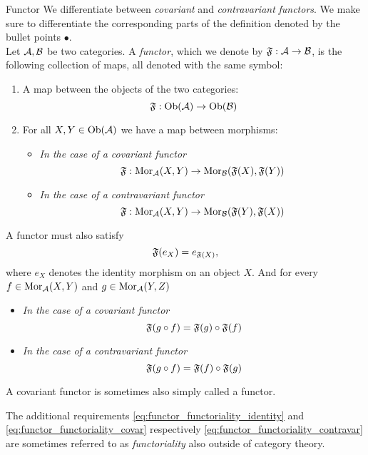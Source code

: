 \begin{definition}{Functor \cite[Sec.~1.3]{Roman2017}}{}
We differentiate between \emph{covariant} and \emph{contravariant} \emph{functors}.
We make sure to differentiate the corresponding parts of the definition denoted by the bullet points $\bullet$.\\

Let $\mathcal{A}, \mathcal{B}$ be two categories. A \emph{functor}, which we denote by $\mathfrak{F}: \mathcal{A} \to \mathcal{B}$, is the following collection of maps, all denoted with the same symbol:
\begin{enumerate}
    \item A map between the objects of the two categories:
    $$
    \mathfrak{F}: \mathrm {Ob}(\mathcal{A}) \to \mathrm {Ob}(\mathcal{B})
    $$
    \item For all $X,Y \in \mathrm {Ob}(\mathcal{A})$ we have a map between morphisms: 
    \begin{itemize}
        \item \emph{In the case of a covariant functor} $$\mathfrak{F}: \mathrm {Mor}_{\mathcal{A}}(X,Y) \to \mathrm {Mor}_{\mathcal{B}}(\mathfrak{F}(X), \mathfrak{F}(Y))$$
        \item \emph{In the case of a contravariant functor} $$\mathfrak{F}: \mathrm {Mor}_{\mathcal{A}}(X,Y) \to \mathrm {Mor}_{\mathcal{B}}(\mathfrak{F}(Y), \mathfrak{F}(X))$$
    \end{itemize}
\end{enumerate}
A functor must also satisfy
\begin{equation}
\label{eq:functor_functoriality_identity}
\mathfrak{F}(e_X) = e_{\mathfrak{F}(X)},
\end{equation}
where $e_X$ denotes the identity morphism on an object $X$. And for every ${f \in \mathrm {Mor}_{\mathcal{A}}(X,Y)}$ and $g \in \mathrm {Mor}_{\mathcal{A}}(Y,Z)$
\begin{itemize}
    \item \emph{In the case of a covariant functor}
    \begin{equation}
    \label{eq:functor_functoriality_covar}
    \mathfrak{F}(g \circ f) = \mathfrak{F}(g) \circ \mathfrak{F}(f)
    \end{equation}
    
    \item \emph{In the case of a contravariant functor}
    \begin{equation}
    \label{eq:functor_functoriality_contravar}
    \mathfrak{F}(g \circ f) = \mathfrak{F}(f) \circ \mathfrak{F}(g)
    \end{equation}
\end{itemize}
A covariant functor is sometimes also simply called a functor.
\end{definition}

The additional requirements \eqref{eq:functor_functoriality_identity} and \eqref{eq:functor_functoriality_covar} respectively \eqref{eq:functor_functoriality_contravar} are sometimes referred to as \emph{functoriality} also outside of category theory.

